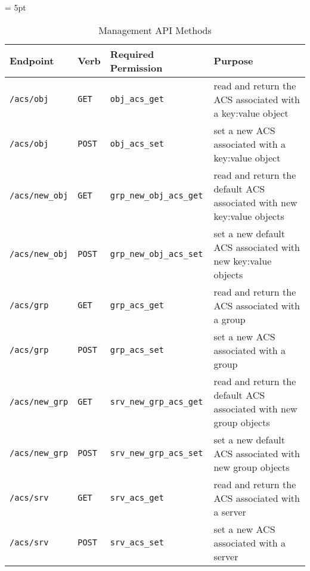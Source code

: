 \begin{table}[!tb]
  \vspace{1ex}
  \begin{center}
    \tabulinesep = 5pt
    \begin{tabu} to \textwidth
      { | X[.7,l,m]
        | X[.3,l,m]
        | X[1,l,m]
        | X[2,l,m]
        | }
      \hline
      \textbf{Endpoint}
      & \textbf{Verb}
      & \textbf{Required Permission}
      & \textbf{Purpose}
      \\ \hline
      \texttt{/acs/obj} & \texttt{GET} & \texttt{obj\_acs\_get}
      & read and return the ACS associated with a key:value object
      \\ \hline
      \texttt{/acs/obj} & \texttt{POST} & \texttt{obj\_acs\_set}
      & set a new ACS associated with a key:value object
      \\ \hline
      \texttt{/acs/new\_obj} & \texttt{GET} & \texttt{grp\_new\_obj\_acs\_get}
      & read and return the default ACS associated with new key:value objects
      \\ \hline
      \texttt{/acs/new\_obj} & \texttt{POST} & \texttt{grp\_new\_obj\_acs\_set}
      & set a new default ACS associated with new key:value objects
      \\ \hline
      \texttt{/acs/grp} & \texttt{GET} & \texttt{grp\_acs\_get}
      & read and return the ACS associated with a group
      \\ \hline
      \texttt{/acs/grp} & \texttt{POST} & \texttt{grp\_acs\_set}
      & set a new ACS associated with a group
      \\ \hline
      \texttt{/acs/new\_grp} & \texttt{GET} & \texttt{srv\_new\_grp\_acs\_get}
      & read and return the default ACS associated with new group objects
      \\ \hline
      \texttt{/acs/new\_grp} & \texttt{POST} & \texttt{srv\_new\_grp\_acs\_set}
      & set a new default ACS associated with new group objects
      \\ \hline
      \texttt{/acs/srv} & \texttt{GET} & \texttt{srv\_acs\_get}
      & read and return the ACS associated with a server
      \\ \hline
      \texttt{/acs/srv} & \texttt{POST} & \texttt{srv\_acs\_set}
      & set a new ACS associated with a server
      \\ \hline
    \end{tabu}
  \end{center}
  \caption{Management API Methods}
  \label{tab:methods-mgmt}
\end{table}


